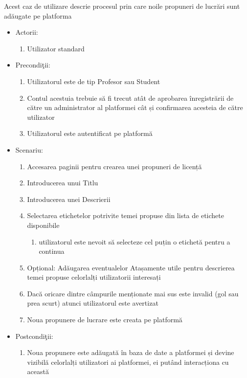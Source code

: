 \documentclass[12pt,a4paper,hidelinks]{report}
\theoremstyle{definition}
\theoremstyle{remark}
\begin{document}
Acest caz de utilizare descrie procesul prin care noile propuneri de lucrări sunt adăugate pe platforma
\begin{itemize}
    \item{Actorii:
        \begin{enumerate}
            \item Utilizator standard
        \end{enumerate}}
    \item{Precondi\c tii:
        \begin{enumerate}
            \item Utilizatorul este de tip Profesor sau Student
            \item Contul acestuia trebuie să fi trecut atât de aprobarea înregistrării de către un administrator al platformei cât și confirmarea acesteia de către utilizator
            \item Utilizatorul este autentificat pe platformă
        \end{enumerate}}
    \item{Scenariu:
        \begin{enumerate}
            \item Accesarea paginii pentru crearea unei propuneri de licență
            \item Introducerea unui Titlu
            \item Introducerea unei Descrierii
            \item {Selectarea etichetelor potrivite temei propuse din lista de etichete disponibile
                \begin{enumerate}
                    \item utilizatorul este nevoit să selecteze cel puțin o etichetă pentru a continua
                \end{enumerate}}
            \item Opțional: Adăugarea eventualelor Atașamente utile pentru descrierea temei propuse celorlalți utilizatorii interesați
            \item Dacă oricare dintre câmpurile menționate mai sus este invalid (gol sau prea scurt) atunci utilizatorul este avertizat
            \item Noua propunere de lucrare este creata pe platformă
        \end{enumerate}}
    \item{Postcondi\c tii:
        \begin{enumerate}
            \item Noua propunere este adăugată în baza de date a platformei și devine vizibilă celorlalți utilizatori ai platformei, ei putând interacționa cu această
        \end{enumerate}}
\end{itemize}
\end{document}
